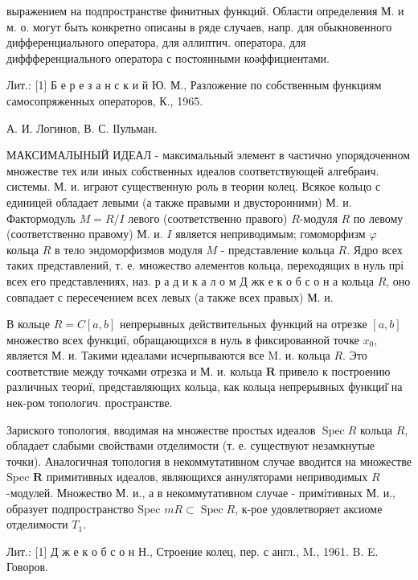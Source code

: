 \documentclass[10pt]{article}
\begin{document}
выражением на подпространстве финитных функций. Области определения М. и м. о. могут быть конкретно описаны в ряде случаев, напр. для обыкновенного дифференциального оператора, для әллиптич. оператора, для диффференциального оператора с постоянными коәффициентами.



Лит.: [1] Б е р е з а н с к и й Ю. М., Разложение по собственным функциям самосопряженных операторов, К., 1965.



А. И. Логинов, В. С. ІІульман.



МАКСИМАЛЫНЫЙ ИДЕАЛ - максимальный элемент в частично упорядоченном множестве тех или иных собственных идеалов соответствующей алгебраич. системы. М. и. играют существенную роль в теории колец. Всякое кольцо с единицей обладает левыми (а также правыми и двусторонними) М. и. Фактормодуль $M=R / I$ левого (соответственно правого) $R$-модуля $R$ по левому (соответственно правому) М. и. $I$ является неприводимым; гомоморфизм $\varphi$ кольца $R$ в тело эндоморфизмов модуля $M$ - представление кольца $R$. Ядро всех таких представлений, т. е. множество әлементов кольца, переходящих в нуль прі всех его представлениях, наз. р а д и к а л о м Д жк е к о б с о н а кольца $R$, оно совпадает с пересечением всех левых (а также всех правых) М. и.



В кольце $R=C[a, b]$ непрерывных действительных функций на отрезке $[a, b]$ множество всех функциї, обращающихся в нуль в фиксированной точке $x_{0}$, является М. и. Такими идеалами исчерпываются все M. и. кольца $R$. Это соответствие между точками отрезка и М. и. кольца $\boldsymbol{R}$ привело к построению различных теориї, представляющих кольца, как кольца непрерывных функциі̆ на нек-ром топологич. пространстве.



Зариского топология, вводимая на множестве простых идеалов $\operatorname{Spec} R$ кольца $R$, обладает слабыми свойствами отделимости (т. е. существуют незамкнутые точки). Аналогичная топология в некоммутативном случае вводится на множестве Spec $\boldsymbol{R}$ примитивных идеалов, являющихся аннуляторами неприводимых $R$-модулей. Множество М. и., а в некоммутативном случае - примітивных М. и., образует подпространство Spec $m R \subset \operatorname{Spec} R$, к-рое удовлетворяет аксиоме отделимости $T_{1}$.



Лит.: [1] Д ж е к о б с о н Н., Строение колец, пер. с англ., M., 1961. B. E. Говоров.
\end{document}
